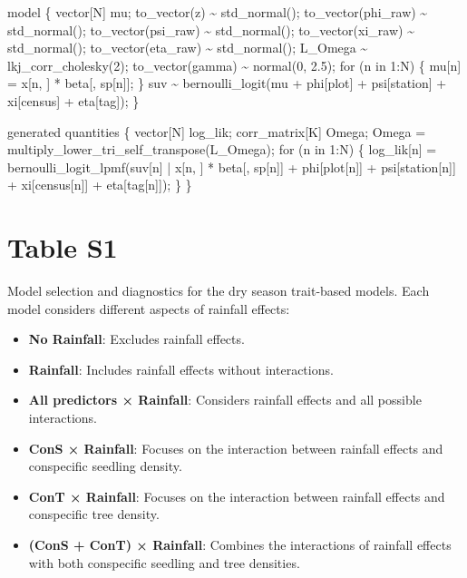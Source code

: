 \documentclass[
  12pt,
  letterpaper,
  DIV=11,
  numbers=noendperiod]{scrartcl}
\newenvironment{Shaded}{\begin{snugshade}}{\end{snugshade}}
\newcommand{\ControlFlowTok}[1]{\textcolor[rgb]{0.00,0.23,0.31}{#1}}
\newcommand{\DataTypeTok}[1]{\textcolor[rgb]{0.68,0.00,0.00}{#1}}
\newcommand{\DecValTok}[1]{\textcolor[rgb]{0.68,0.00,0.00}{#1}}
\newcommand{\FloatTok}[1]{\textcolor[rgb]{0.68,0.00,0.00}{#1}}
\newcommand{\KeywordTok}[1]{\textcolor[rgb]{0.00,0.23,0.31}{#1}}
\newcommand{\NormalTok}[1]{\textcolor[rgb]{0.00,0.23,0.31}{#1}}
\providecommand{\tightlist}{%
  \setlength{\itemsep}{0pt}\setlength{\parskip}{0pt}}\usepackage{longtable,booktabs,array}
\begin{document}
\begin{Shaded}
\begin{Highlighting}[]
\KeywordTok{model}\NormalTok{ \{}
  \DataTypeTok{vector}\NormalTok{[N] mu;}
\NormalTok{  to\_vector(z) \textasciitilde{} std\_normal();}
\NormalTok{  to\_vector(phi\_raw) \textasciitilde{} std\_normal();}
\NormalTok{  to\_vector(psi\_raw) \textasciitilde{} std\_normal();}
\NormalTok{  to\_vector(xi\_raw) \textasciitilde{} std\_normal();}
\NormalTok{  to\_vector(eta\_raw) \textasciitilde{} std\_normal();}
\NormalTok{  L\_Omega \textasciitilde{} lkj\_corr\_cholesky(}\DecValTok{2}\NormalTok{);}
\NormalTok{  to\_vector(gamma) \textasciitilde{} normal(}\DecValTok{0}\NormalTok{, }\FloatTok{2.5}\NormalTok{);}
  \ControlFlowTok{for}\NormalTok{ (n }\ControlFlowTok{in} \DecValTok{1}\NormalTok{:N) \{}
\NormalTok{    mu[n] = x[n, ] * beta[, sp[n]];}
\NormalTok{  \}}
\NormalTok{  suv \textasciitilde{} bernoulli\_logit(mu + phi[plot] + psi[station] + xi[census] + eta[tag]);}
\NormalTok{\}}

\KeywordTok{generated quantities}\NormalTok{ \{}
  \DataTypeTok{vector}\NormalTok{[N] log\_lik;}
  \DataTypeTok{corr\_matrix}\NormalTok{[K] Omega;}
\NormalTok{  Omega = multiply\_lower\_tri\_self\_transpose(L\_Omega);}
  \ControlFlowTok{for}\NormalTok{ (n }\ControlFlowTok{in} \DecValTok{1}\NormalTok{:N) \{}
\NormalTok{    log\_lik[n] = bernoulli\_logit\_lpmf(suv[n] | x[n, ] * beta[, sp[n]] +}
\NormalTok{      phi[plot[n]] + psi[station[n]] + xi[census[n]] + eta[tag[n]]);}
\NormalTok{  \}}
\NormalTok{\}}
\end{Highlighting}
\end{Shaded}

\newpage

\hypertarget{table-s1}{%
\section{Table S1}\label{table-s1}}

Model selection and diagnostics for the dry season trait-based models.
Each model considers different aspects of rainfall effects:

\begin{itemize}
\tightlist
\item
  \textbf{No Rainfall}: Excludes rainfall effects.
\item
  \textbf{Rainfall}: Includes rainfall effects without interactions.
\item
  \textbf{All predictors × Rainfall}: Considers rainfall effects and all
  possible interactions.
\item
  \textbf{ConS × Rainfall}: Focuses on the interaction between rainfall
  effects and conspecific seedling density.
\item
  \textbf{ConT × Rainfall}: Focuses on the interaction between rainfall
  effects and conspecific tree density.
\item
  \textbf{(ConS + ConT) × Rainfall}: Combines the interactions of
  rainfall effects with both conspecific seedling and tree densities.
\end{itemize}
\end{document}
